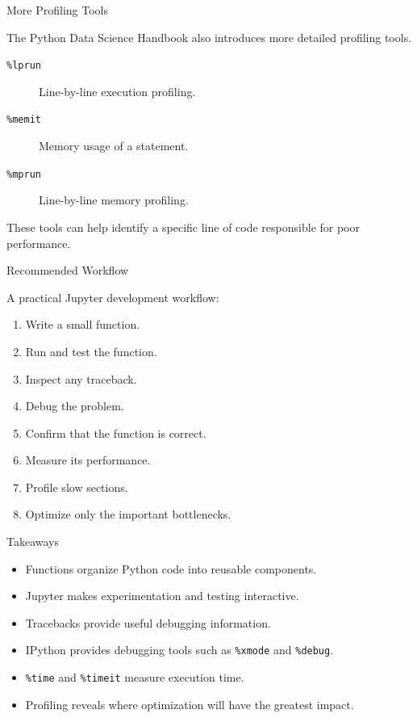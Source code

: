 \documentclass[aspectratio=43,10pt]{beamer}
\begin{document}
\begin{frame}{More Profiling Tools}

The Python Data Science Handbook also introduces more detailed profiling tools.

\begin{description}
  \item[\texttt{\%lprun}] Line-by-line execution profiling.
  \item[\texttt{\%memit}] Memory usage of a statement.
  \item[\texttt{\%mprun}] Line-by-line memory profiling.
\end{description}

\vspace{0.4cm}

These tools can help identify a specific line of code responsible for poor performance.

\end{frame}

\begin{frame}{Recommended Workflow}

A practical Jupyter development workflow:

\begin{enumerate}
  \item Write a small function.
  \item Run and test the function.
  \item Inspect any traceback.
  \item Debug the problem.
  \item Confirm that the function is correct.
  \item Measure its performance.
  \item Profile slow sections.
  \item Optimize only the important bottlenecks.
\end{enumerate}

\end{frame}

\begin{frame}{Takeaways}

\begin{itemize}
  \item Functions organize Python code into reusable components.
  \item Jupyter makes experimentation and testing interactive.
  \item Tracebacks provide useful debugging information.
  \item IPython provides debugging tools such as \texttt{\%xmode} and \texttt{\%debug}.
  \item \texttt{\%time} and \texttt{\%timeit} measure execution time.
  \item Profiling reveals where optimization will have the greatest impact.
\end{itemize}

\end{frame}
\end{document}
